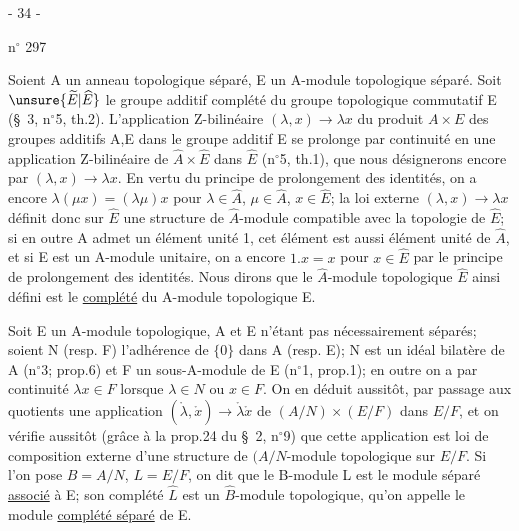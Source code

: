 \begin{center}- 34 -\end{center}
\hfill n$^\circ$ 297

Soient A un anneau topologique séparé, E un A-module topologique séparé. Soit $\unsure{\widetilde E|\widehat E}$ le groupe additif complété du groupe topologique commutatif E (\S\ 3, n$^\circ$5, th.2). L'application Z-bilinéaire $(\lambda,x)\longrightarrow\lambda x$ du produit $A\times E$ des groupes additifs A,E dans le groupe additif E se prolonge par continuité en une application Z-bilinéaire de $\widehat A\times\widehat E$ dans $\widehat E$ (n$^\circ$5, th.1), que nous désignerons encore par $(\lambda,x)\longrightarrow\lambda x$. En vertu du principe de prolongement des identités, on a encore $\lambda(\mu x)=(\lambda\mu)x$ pour $\lambda\in\widehat A$, $\mu\in\widehat A$, $x\in\widehat E$; la loi externe $(\lambda,x)\longrightarrow\lambda x$ définit donc sur $\widehat E$ une structure de $\widehat A$-module compatible avec la topologie de $\widehat E$; si en outre A admet un élément unité 1, cet élément est aussi élément unité de $\widehat A$, et si E est un A-module unitaire, on a encore $1.x=x$ pour $x\in\widehat E$ par le principe de prolongement des identités. Nous dirons que le $\widehat A$-module topologique $\widehat E$ ainsi défini est le \uline{complété} du A-module topologique E.

Soit E un A-module topologique, A et E n'étant pas nécessairement séparés; soient N (resp. F) l'adhérence de $\{0\}$ dans A (resp. E); N est un idéal bilatère de A (n$^\circ$3; prop.6) et F un sous-A-module de E (n$^\circ$1, prop.1); en outre on a par continuité $\lambda x\in F$ lorsque $\lambda\in N$ ou $x\in F$. On en déduit aussitôt, par passage aux quotients une application $(\mathring\lambda,\mathring x)\longrightarrow\mathring\lambda\mathring x$ de $(A/N)\times(E/F)$ dans $E/F$, et on vérifie aussitôt (grâce à la prop.24 du \S\ 2, n$^\circ$9) que cette application est loi de composition externe d'une structure de $(A/N$-module topologique sur $E/F$. Si l'on pose $B=A/N$, $L=E/F$, on dit que le B-module L est le module séparé \uline{associé} à E; son complété $\widehat L$ est un $\widehat B$-module topologique, qu'on appelle le module \uline{complété séparé} de E.

